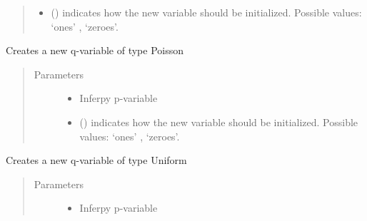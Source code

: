 \documentclass[letterpaper,10pt,english]{sphinxmanual}
\begin{document}
\begin{fulllineitems}
\begin{fulllineitems}
\begin{quote}
\begin{description}
\begin{itemize}
\item {} 
 () \textendash{} indicates how the new variable should be initialized. Possible values: ‘ones’ , ‘zeroes’.

\end{itemize}

\end{description}\end{quote}

\end{fulllineitems}


\begin{fulllineitems}
\label{\detokenize{modules/inferpy.inferences:inferpy.inferences.qmodel.Qmodel.Poisson}}
Creates a new q-variable of type Poisson
\begin{quote}\begin{description}
\item[{Parameters}] \leavevmode\begin{itemize}
\item {} 
 \textendash{} Inferpy p-variable

\item {} 
 () \textendash{} indicates how the new variable should be initialized. Possible values: ‘ones’ , ‘zeroes’.

\end{itemize}

\end{description}\end{quote}

\end{fulllineitems}


\begin{fulllineitems}
\label{\detokenize{modules/inferpy.inferences:inferpy.inferences.qmodel.Qmodel.Uniform}}
Creates a new q-variable of type Uniform
\begin{quote}\begin{description}
\item[{Parameters}] \leavevmode\begin{itemize}
\item {} 
 \textendash{} Inferpy p-variable


\end{itemize}
\end{description}
\end{quote}
\end{fulllineitems}
\end{fulllineitems}
\end{document}
